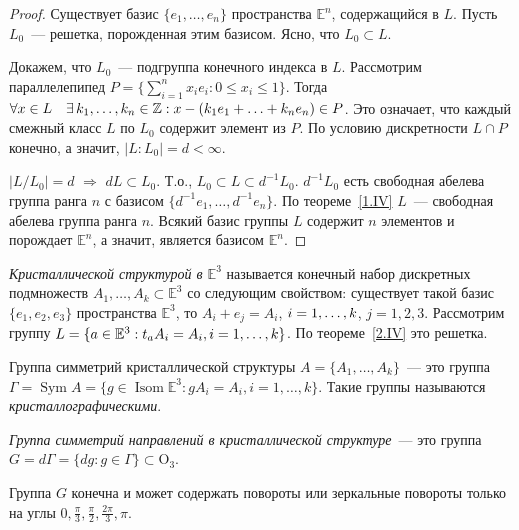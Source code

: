 \documentclass[a4paper]{article}
\newcommand{\Isom}{\mathop{\mathrm{Isom}}\nolimits}
\newcommand{\Sym}{\mathop{\mathrm{Sym}}\nolimits}
\newcommand*{\p}[1]{#1\nobreak\discretionary{}{\hbox{$\mathsurround=0pt #1$}}{}}
\begin{document}
\begin{proof}
Существует базис $\{e_1,\ldots,e_n\}$ пространства $\mathbb{E}^n$,
содержащийся в $L$. Пусть $L_0$~--- решетка, порожденная этим
базисом. Ясно, что $L_0\subset L$.

Докажем, что $L_0$~--- подгруппа конечного индекса в $L$. Рассмотрим
параллелепипед $P=\Big\{\sum\limits_{i=1}^n x_ie_i: 0\leqslant
x_i\leqslant 1\Big\}$. Тогда $\forall x\in L\quad\exists \,
k_1,\ldots,k_n\p\in\mathbb{Z}: x-(k_1e_1+\ldots+k_ne_n)\in P$. Это
означает, что каждый смежный класс $L$ по $L_0$ содержит элемент из
$P$. По условию дискретности $L\cap P$ конечно, а значит,
$|L:L_0|=d<\infty$.

$|L/L_0|=d$ $\Rightarrow$ $dL\subset L_0$. Т.о., $L_0\subset
L\subset d^{-1}L_0$. $d^{-1}L_0$ есть свободная абелева группа ранга
$n$ с базисом $\{d^{-1}e_1,\ldots,d^{-1}e_n\}$. По
теореме~\ref{1.IV} $L$~--- свободная абелева группа ранга $n$.
Всякий базис группы $L$ содержит $n$ элементов и порождает
$\mathbb{E}^n$, а значит, является базисом $\mathbb{E}^n$.
\end{proof}

\emph{Кристаллической структурой в $\mathbb{E}^3$} называется
конечный набор дискретных подмножеств $A_1,\ldots,A_k\subset
\mathbb{E}^3$ со следующим свойством: существует такой базис
$\{e_1,e_2,e_3\}$ пространства $\mathbb{E}^3$, то $A_i+e_j=A_i$,
$i\p=1,\ldots,k$, $j=1,2,3$. Рассмотрим группу
$L=\{a\in\mathbb{E}^3: t_aA_i=A_i, i\p=1,\ldots,k\}$. По
теореме~\ref{2.IV} это решетка.

Группа симметрий кристаллической структуры
$A=\{A_1,\ldots,A_k\}$~--- это группа $\Gamma=\Sym A=\{g\in
\Isom\mathbb{E}^3: gA_i=A_i, i=1,\ldots,k\}$. Такие группы
называются \emph{кристаллографическими}.

\emph{Группа симметрий направлений в кристаллической структуре}~---
это группа $G=d\Gamma=\{dg:g\in\Gamma\}\subset \mathrm{O}_3$.

\begin{theorem}
Группа $G$ конечна и может содержать повороты или зеркальные
повороты только на углы
$0,\frac{\pi}{3},\frac{\pi}{2},\frac{2\pi}{3},\pi$.
\end{theorem}
\end{document}
